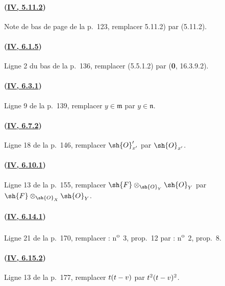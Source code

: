 \paragraph{({\texorpdfstring{\protect\hyperref[canon-index.ega4.c04.cor.5-11-2]{IV, 5.11.2}}{IV, 5.11.2}})}
Note de bas de page de la p.~123, remplacer 5.11.2) par (5.11.2).

\paragraph{({\texorpdfstring{\protect\hyperref[canon-index.ega4.c04.prop.6-1-5]{IV, 6.1.5}}{IV, 6.1.5}})}
Ligne 2 du bas de la p.~136, remplacer (5.5.1.2) par
(\textbf{0}, 16.3.9.2).

\paragraph{({\texorpdfstring{\protect\hyperref[canon-index.ega4.c04.prop.6-3-1]{IV, 6.3.1}}{IV, 6.3.1}})}
Ligne 9 de la p.~139, remplacer $y\in\mathfrak m$ par
$y\in\mathfrak n$.

\paragraph{({\texorpdfstring{\protect\hyperref[canon-index.ega4.c04.cor.6-7-2]{IV, 6.7.2}}{IV, 6.7.2}})}
Ligne 18 de la p.~146, remplacer $\sh{O}'_{x'}$ par $\sh{O}_{x'}$.

\paragraph{({\texorpdfstring{\protect\hyperref[canon-index.ega4.c04.statement.6-10-1]{IV, 6.10.1}}{IV, 6.10.1}})}
Ligne 13 de la p.~155, remplacer
$\sh{F}\otimes_{\sh{O}_Y}\sh{O}_Y$ par
$\sh{F}\otimes_{\sh{O}_X}\sh{O}_Y$.

\paragraph{({\texorpdfstring{\protect\hyperref[canon-index.ega4.c04.prop.6-14-1]{IV, 6.14.1}}{IV, 6.14.1}})}
Ligne 21 de la p.~170, remplacer : n\textsuperscript{o}~3, prop.~12
par : n\textsuperscript{o}~2, prop.~8.

\paragraph{({\texorpdfstring{\protect\hyperref[canon-index.ega4.c04.statement.6-15-2]{IV, 6.15.2}}{IV, 6.15.2}})}
Ligne 13 de la p.~177, remplacer $t(t- v)$ par $t^2(t- v)^2$.

